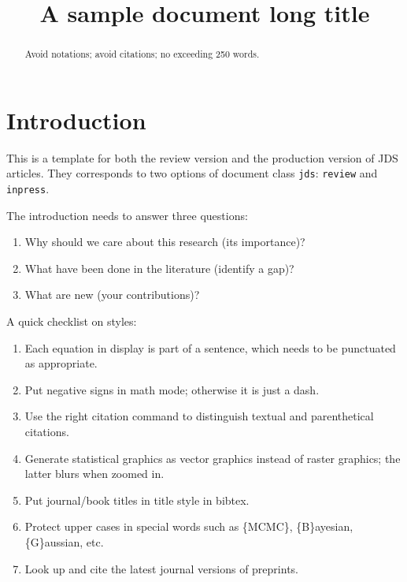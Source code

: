 \documentclass[linenumber]{jdsart}
\theoremstyle{plain}
\theoremstyle{remark}
\theoremstyle{definition}
\begin{document}
\begin{frontmatter}

\title{A sample document long title}

\author[1]{ }
\author[2]{ }
\address[1]{Address of the First author, , }
\address[2]{Address of the Second author, , }

\begin{abstract} %
Avoid notations; avoid citations; no exceeding 250 words. 
\end{abstract}

\begin{keyword} %
\kwd{\LaTeX}
\end{keyword}

\end{frontmatter}

\section{Introduction}

This is a template for both the review version and the
production
version of JDS articles. They corresponds to two options of
document
class \texttt{jds}: \texttt{review} and \texttt{inpress}.


The introduction needs to answer three questions:
\begin{enumerate}
\item Why should we care about this research (its importance)?
\item What have been done in the literature (identify a gap)?
\item What are new (your contributions)?
\end{enumerate}

A quick checklist on styles:
\begin{enumerate}
\item Each equation in display is part of a sentence, which needs to
  be punctuated as appropriate.
\item Put negative signs in math mode; otherwise it is just a dash.
\item Use the right citation command to distinguish textual and
  parenthetical citations.
\item Generate statistical graphics as vector graphics instead of
  raster graphics; the latter blurs when zoomed in.
\item Put journal/book titles in title style in bibtex.
\item Protect upper cases in special words such as \{MCMC\},
  \{B\}ayesian, \{G\}aussian, etc.
\item Look up and cite the latest journal versions of preprints.
\end{enumerate}
\end{document}
